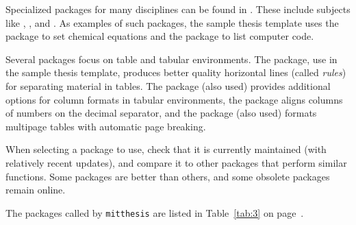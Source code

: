 \documentclass[11pt]{article}
\begin{document}
Specialized packages for many disciplines can be found in .  These include subjects like , , and .  As examples of such packages, the sample thesis template uses the package \texttt{} to set chemical equations and the package \texttt{} to list computer code.

Several packages focus on table and tabular environments.  The \texttt{} package, use in the sample thesis template, produces better quality horizontal lines (called \textit{rules}) for separating material in tables.  The \texttt{} package (also used) provides additional options for column formats in tabular environments, the \texttt{} package aligns columns of numbers on the decimal separator, and the \texttt{} package (also used) formats multipage tables with automatic page breaking.

When selecting a package to use, check that it is currently maintained (with relatively recent updates), and compare it to other packages that perform similar functions.  Some packages are better than others, and some obsolete packages remain online.

The packages called by \texttt{mitthesis} are listed in Table~\ref{tab:3} on page~\pageref{tab:3}.
\end{document}
